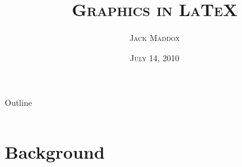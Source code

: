 \documentclass[article]{beamer}
\title{\textsc{Graphics in \LaTeX}}
\author[Jack Maddox]{\textsc{Jack Maddox}}
\institute{\textsc{Department of Mechanical Engineering\\Auburn University}}
\date[7/14/2010]{\textsc{\scriptsize{July 14, 2010}}}
\begin{document}
\maketitle

\begin{frame}[shrink]{Outline}{}
{\footnotesize 
\begin{columns}
\begin{column}[t]{0.5\textwidth}
\tableofcontents[sections={1-3}]
\end{column}
\begin{column}[t]{0.5\textwidth}
\tableofcontents[sections={4-5}]
\end{column}
\end{columns}
}
\end{frame}

\section{Background}
\end{document}
